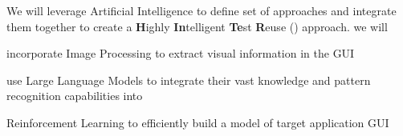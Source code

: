\bigskip
We will leverage Artificial Intelligence to define set of \testreuse approaches and integrate them together to create a \textbf{H}ighly \textbf{In}telligent \textbf{Te}st \textbf{R}euse (\project) approach.
we will
\begin{inparaenum}[(i)]
\item incorporate Image Processing to extract visual information in the GUI
\item use Large Language Models to integrate their vast knowledge and pattern recognition capabilities into \testreuse
\item Reinforcement Learning  to efficiently build a model of target application GUI
\end{inparaenum}





